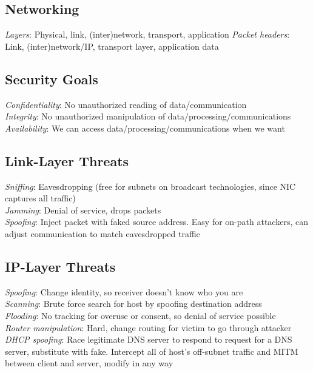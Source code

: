 \documentclass[10pt,landscape]{article}
\begin{document}
\begin{multicols}{3}

\section{Networking}

\textit{Layers}: Physical, link, (inter)network, transport, application
\textit{Packet headers}: Link, (inter)network/IP, transport layer, application data

\subsection{Security Goals}

\textit{Confidentiality}: No unauthorized reading of data/communication \\
\textit{Integrity}: No unauthorized manipulation of data/processing/communications \\
\textit{Availability}: We can access data/processing/communications when we want

\subsection{Link-Layer Threats}

\textit{Sniffing}: Eavesdropping (free for subnets on broadcast technologies, since NIC captures all traffic) \\
\textit{Jamming}: Denial of service, drops packets \\
\textit{Spoofing}: Inject packet with faked source address. Easy for on-path attackers, can adjust communication to match eavesdropped traffic

\subsection{IP-Layer Threats}

\textit{Spoofing}: Change identity, so receiver doesn't know who you are \\
\textit{Scanning}: Brute force search for host by spoofing destination address \\
\textit{Flooding}: No tracking for overuse or consent, so denial of service possible \\
\textit{Router manipulation}: Hard, change routing for victim to go through attacker \\
\textit{DHCP spoofing}: Race legitimate DNS server to respond to request for a DNS server, substitute with fake. Intercept all of host's off-subnet traffic and MITM between client and server, modify in any way


\end{multicols}
\end{document}
